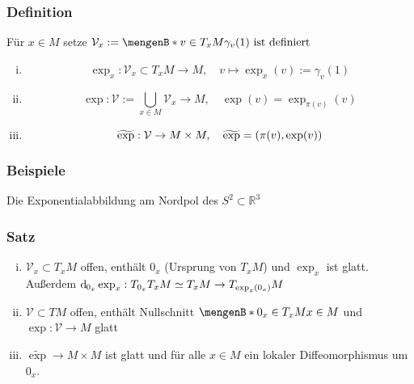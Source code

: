 \subsubsection{Definition}
\label{ssub:243}
Für $x\in M$ setze $\mathcal{V}_x := \set[v\in T_x M]{\gamma_v(1)\ \text{ist definiert}}$
\begin{enumerate}[(i)]
\item {}
\[
\exp_x : \mathcal{V}_x\subset T_x M \to M,\quad v\mapsto \exp_x(v) := \gamma_v (1)
\]
\item {}
\[
\exp: \mathcal{V} := \bigcup_{x\in M} \mathcal{V}_x \to M,\quad \exp(v) = \exp_{\pi(v)}(v)
\]
\item {}
\[
\widetilde{\exp}: \mathcal{V} \to M\times M,\quad \widetilde{\exp} = (\pi(v), \exp(v))
\]
\end{enumerate}

\subsubsection{Beispiele}
\label{ssub:244}
Die Exponentialabbildung am Nordpol des $S^2\subset \mathds{R}^3$

\subsubsection{Satz}
\label{ssub:245}
\begin{enumerate}[(i)]
\item $\mathcal{V}_x\subset T_x M$ offen, enthält $0_x$ (Ursprung von $T_x M$) und $\exp_x$ ist glatt. Außerdem $\mathrm{d}\mkern-1.0mu_{0_x} \exp_x: T_{0_x}T_x M \simeq T_x M \to T_{\exp_x(0_x)}M$
\item $\mathcal{V}\subset TM$ offen, enthält Nullschnitt $\set[0_x\in T_x M]{x\in M}$ und $\exp:\mathcal{V}\to M$ glatt
\item $\widetilde{\exp}\to M\times M$ ist glatt und für alle $x\in M$ ein lokaler Diffeomorphismus um $0_x$.
\end{enumerate}

